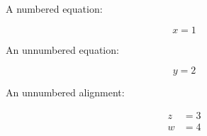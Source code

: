 A numbered equation:

\begin{equation}\label{eq:a}
x = 1
\end{equation}

An unnumbered equation:

\begin{equation*}
y = 2
\end{equation*}

An unnumbered alignment:

\begin{align*}
z &= 3 \\
w &= 4
\end{align*}

